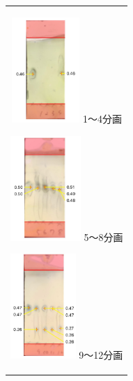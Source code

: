 \documentclass[a4paper,papersize,dvipdfmx]{jsarticle}
\begin{document}
\begin{figure}[H]
\begin{center}
\begin{tabular}{c}

\begin{minipage}{0.15\hsize}
\begin{center}
\includegraphics[clip, height=4cm]{imgs5/tlc-r1.jpg}
\hspace{1.6cm} 1〜4分画
\end{center}
\end{minipage}

\begin{minipage}{0.06\hsize}
        \hspace{2mm}
      \end{minipage}

\begin{minipage}{0.15\hsize}
\begin{center}
\includegraphics[clip, height=4cm]{imgs5/tlc-r2.jpg}
\hspace{1.6cm} 5〜8分画
\end{center}
\end{minipage}

\begin{minipage}{0.06\hsize}
        \hspace{2mm}
      \end{minipage}

\begin{minipage}{0.15\hsize}
\begin{center}
\includegraphics[clip, height=4cm]{imgs5/tlc-r3.jpg}
\hspace{1.6cm} 9〜12分画
\end{center}
\end{minipage}


\end{tabular}
\end{center}
\end{figure}
\end{document}
